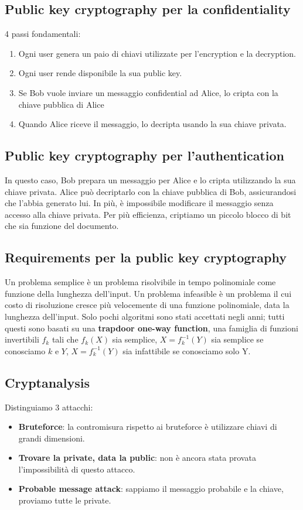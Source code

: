 \documentclass[11pt]{article}
\begin{document}
\subsection{Public key cryptography per la confidentiality}
4 passi fondamentali:
\begin{enumerate}
    \item Ogni user genera un paio di chiavi utilizzate per l'encryption e la decryption.
    \item Ogni user rende disponibile la sua public key.
    \item Se Bob vuole inviare un messaggio confidential ad Alice, lo cripta con la chiave pubblica di Alice
    \item Quando Alice riceve il messaggio, lo decripta usando la sua chiave privata.
\end{enumerate}
\subsection{Public key cryptography per l'authentication}
In questo caso, Bob prepara un messaggio per Alice e lo cripta utilizzando la sua chiave privata. Alice può decriptarlo con la chiave pubblica di Bob, assicurandosi che l'abbia generato lui. In più, è impossibile modificare il messaggio senza accesso alla chiave privata. Per più efficienza, criptiamo un piccolo blocco di bit che sia funzione del documento.
\subsection{Requirements per la public key cryptography}
Un problema semplice è un problema risolvibile in tempo polinomiale come funzione della lunghezza dell'input. Un problema infeasible è un problema il cui costo di risoluzione cresce più velocemente di una funzione polinomiale, data la lunghezza dell'input. Solo pochi algoritmi sono stati accettati negli anni; tutti questi sono basati su una \textbf{trapdoor one-way function}, una famiglia di funzioni invertibili $f_k$ tali che $f_k(X)$ sia semplice, $X=f_k^{-1}(Y)$ sia semplice se conosciamo $k$ e $Y$, $X=f_k^{-1}(Y)$ sia infattibile se conosciamo solo Y.
\subsection{Cryptanalysis}
Distinguiamo 3 attacchi:
\begin{itemize}
    \item \textbf{Bruteforce}: la contromisura rispetto ai bruteforce è utilizzare chiavi di grandi dimensioni. 
    \item \textbf{Trovare la private, data la public}: non è ancora stata provata l'impossibilità di questo attacco. 
    \item \textbf{Probable message attack}: sappiamo il messaggio probabile e la chiave, proviamo tutte le private.
\end{itemize}
\end{document}
